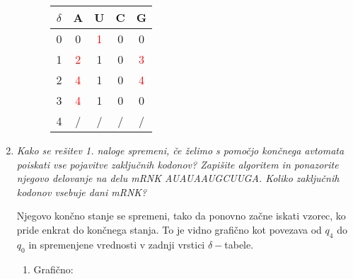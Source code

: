 \documentclass{article}
\begin{document}
\begin{enumerate}
\begin{enumerate}
\begin{itemize}
						\begin{tabular}{|c||c|c|c|c|}
							\hline
							$\delta$ & A & U & C & G \\
							\hline \hline
							0 & 0 & \textcolor{red}{1} & 0 & 0 \\
							\hline
							1 & \textcolor{red}{2} & 1 & 0 & \textcolor{red}{3} \\
							\hline
							2 & \textcolor{red}{4} & 1 & 0 & \textcolor{red}{4} \\
							\hline
							3 & \textcolor{red}{4} & 1 & 0 & 0 \\
							\hline
							4 & / & / & / & / \\
							\hline
						\end{tabular}
				\end{itemize}
		\end{enumerate}

		\newpage

	\item \textit{Kako se rešitev 1. naloge spremeni, če želimo s pomočjo končnega
			avtomata poiskati vse pojavitve zaključnih kodonov? Zapišite algoritem
			in ponazorite njegovo delovanje na delu mRNK AUAUAAUGCUUGA. Koliko
		zaključnih kodonov vsebuje dani mRNK?}

		Njegovo končno stanje se spremeni, tako da ponovno začne iskati vzorec, ko
		pride enkrat do
		končnega stanja. To je vidno grafično kot povezava od $q_4$ do $q_0$ in
		spremenjene vrednosti v zadnji vrstici $\delta-$tabele.

		\begin{enumerate}
			\item Grafično:

\end{enumerate}
\end{enumerate}
\end{document}
